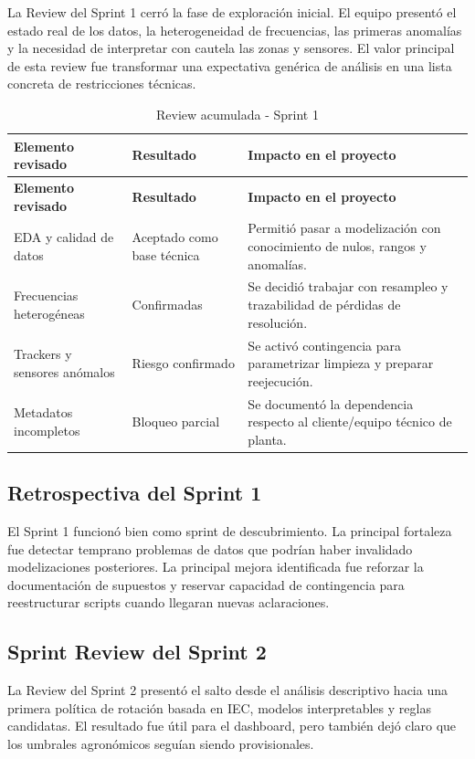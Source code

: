 \documentclass[11pt,a4paper]{article}
\begin{document}
La Review del Sprint 1 cerró la fase de exploración inicial. El equipo presentó el estado real de los datos, la heterogeneidad de frecuencias, las primeras anomalías y la necesidad de interpretar con cautela las zonas y sensores. El valor principal de esta review fue transformar una expectativa genérica de análisis en una lista concreta de restricciones técnicas.

\begin{longtable}{p{}p{}p{}}
\caption{Review acumulada - Sprint 1}\\
\toprule
\textbf{Elemento revisado} & \textbf{Resultado} & \textbf{Impacto en el proyecto} \\
\midrule
\endfirsthead
\toprule
\textbf{Elemento revisado} & \textbf{Resultado} & \textbf{Impacto en el proyecto} \\
\midrule
\endhead
EDA y calidad de datos & Aceptado como base técnica & Permitió pasar a modelización con conocimiento de nulos, rangos y anomalías. \\
Frecuencias heterogéneas & Confirmadas & Se decidió trabajar con resampleo y trazabilidad de pérdidas de resolución. \\
Trackers y sensores anómalos & Riesgo confirmado & Se activó contingencia para parametrizar limpieza y preparar reejecución. \\
Metadatos incompletos & Bloqueo parcial & Se documentó la dependencia respecto al cliente/equipo técnico de planta. \\
\bottomrule
\end{longtable}

\subsection{Retrospectiva del Sprint 1}

El Sprint 1 funcionó bien como sprint de descubrimiento. La principal fortaleza fue detectar temprano problemas de datos que podrían haber invalidado modelizaciones posteriores. La principal mejora identificada fue reforzar la documentación de supuestos y reservar capacidad de contingencia para reestructurar scripts cuando llegaran nuevas aclaraciones.

\subsection{Sprint Review del Sprint 2}

La Review del Sprint 2 presentó el salto desde el análisis descriptivo hacia una primera política de rotación basada en IEC, modelos interpretables y reglas candidatas. El resultado fue útil para el dashboard, pero también dejó claro que los umbrales agronómicos seguían siendo provisionales.
\end{document}
